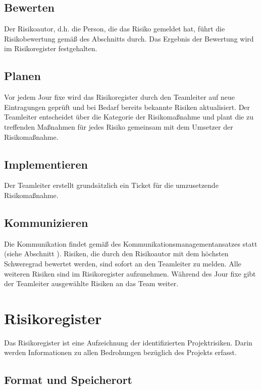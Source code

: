 \documentclass[a4paper,11pt,listof=numbered,glossary=totoc,parskip=half,toc=bib]{scrreprt}
\begin{document}
{\subsection{Bewerten}

Der Risikoautor, d.h. die Person, die das Risiko gemeldet hat, führt die Risikobewertung gemäß des Abschnitts  durch. Das Ergebnis der Bewertung wird im Risikoregister festgehalten.

\subsection{Planen}

Vor jedem Jour fixe wird das Risikoregister durch den Teamleiter auf neue Eintragungen geprüft und bei Bedarf bereits bekannte Risiken aktualisiert. Der Teamleiter entscheidet über die Kategorie der Risikomaßnahme und plant die zu treffenden Maßnahmen für jedes Risiko gemeinsam mit dem Umsetzer der Risikomaßnahme.

\subsection{Implementieren}

Der Teamleiter erstellt grundsätzlich ein Ticket für die umzusetzende Risikomaßnahme.

\subsection{Kommunizieren}

Die Kommunikation findet gemäß des Kommunikationsmanagementansatzes statt (siehe Abschnitt ). Risiken, die durch den Risikoautor mit dem höchsten Schweregrad bewertet werden, sind sofort an den Teamleiter zu melden. Alle weiteren Risiken sind im Risikoregister aufzunehmen. Während des Jour fixe gibt der Teamleiter ausgewählte Risiken an das Team weiter.

\section{Risikoregister}
\label{subsec:risikoregister}

Das Risikoregister ist eine Aufzeichnung der identifizierten Projektrisiken. Darin werden Informationen zu allen Bedrohungen bezüglich des Projekts erfasst.

\subsection{Format und Speicherort}

}
\end{document}
